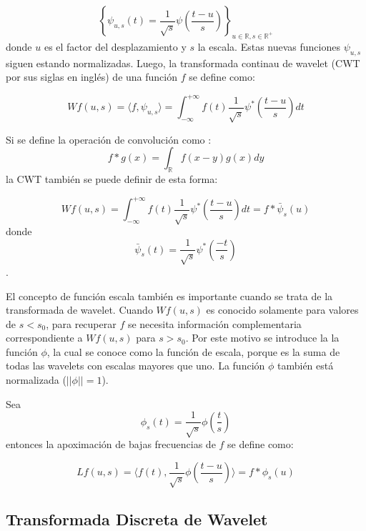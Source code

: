 \begin{equation}
	\left\{ \psi_{u,s}(t)= \frac{1}{\sqrt{s}}\psi(\frac{t-u}{s}) \right\}_{u \in \mathbb{R}, s \in \mathbb{R^+}}
\end{equation}
\noindent donde $u$ es el factor del desplazamiento y $s$ la escala. Estas nuevas funciones $\psi_{u,s}$ siguen estando
normalizadas. Luego, la transformada continau de wavelet (CWT por sus siglas en inglés) de una función $f$ se define como:

\begin{equation}
	Wf(u,s) = \langle f,\psi_{u,s} \rangle = \int_{-\infty}^{+\infty}  f(t)\frac{1}{\sqrt{s}}\psi^*(\frac{t-u}{s}) dt
\end{equation}

Si se define la operación de convolución como :
\begin{equation}
	f*g(x) = \int_{\mathbb{R}} f(x-y)g(x)dy
\end{equation}
\noindent la CWT también se puede definir de esta forma:

\begin{equation}
	Wf(u,s) = \int_{-\infty}^{+\infty}  f(t)\frac{1}{\sqrt{s}}\psi^*(\frac{t-u}{s}) dt = f*\bar \psi_s(u)
\end{equation}
\noindent donde $$\bar \psi_s(t)=\frac{1}{\sqrt{s}}\psi^*(\frac{-t}{s})$$.

El concepto de función escala también es importante cuando se trata de la transformada de wavelet. 
Cuando $Wf(u,s)$ es conocido solamente para valores de $s<s_0$, para recuperar $f$ se necesita información
complementaria correspondiente a $Wf(u,s)$ para $s>s_0$. Por este motivo se introduce la 
la función $\phi$, la cual se conoce como la función de escala, porque es la suma de todas las wavelets con
escalas mayores que uno. La función $\phi$ también está normalizada ($||\phi||=1$).

Sea 
\begin{equation}
	\phi_s(t) = \frac{1}{\sqrt{s}}\phi(\frac{t}{s})
\end{equation}
\noindent entonces la apoximación de bajas frecuencias de $f$ se define como:

\begin{equation}
	Lf(u,s) = \langle f(t),\frac{1}{\sqrt{s}}\phi(\frac{t-u}{s}) \rangle = f*\phi_s(u)
\end{equation}


\subsection{Transformada Discreta de Wavelet}

